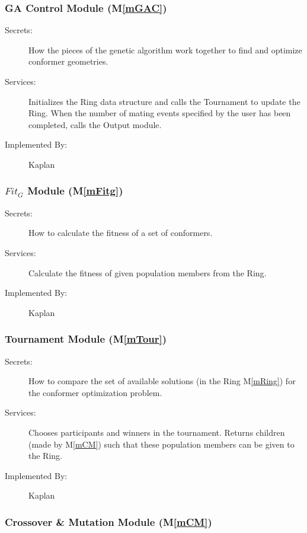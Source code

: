 \documentclass[12pt, titlepage]{article}
\newcommand{\mref}[1]{M\ref{#1}}
\newcommand{\progname}{Kaplan} %
\begin{document}
\subsubsection{GA Control Module (\mref{mGAC})}

\begin{description}
	\item[Secrets:] How the pieces of the genetic algorithm work together to 
	find and optimize conformer geometries.
	\item[Services:] Initializes the Ring data structure and calls the 
	Tournament to update the Ring. When the number of mating events specified 
	by the user has been completed, calls the Output module. 
	\item[Implemented By:] \progname{}
\end{description}

\subsubsection{$Fit_G$ Module (\mref{mFitg})}

\begin{description}
	\item[Secrets:] How to calculate the fitness of a set of conformers.
	\item[Services:] Calculate the fitness of given population members from the 
	Ring.
	\item[Implemented By:] \progname{}
\end{description}

\subsubsection{Tournament Module (\mref{mTour})}

\begin{description}
	\item[Secrets:] How to compare the set of available solutions (in the Ring 
	\mref{mRing}) for the conformer optimization problem.
	\item[Services:] Chooses participants and winners in the 
	tournament. Returns children (made by \mref{mCM}) such that these 
	population members can be given to the Ring.
	\item[Implemented By:] \progname{}
\end{description}

\subsubsection{Crossover \& Mutation Module (\mref{mCM})}
\end{document}
